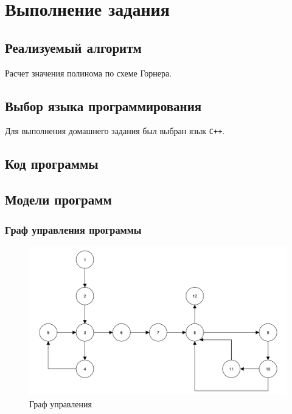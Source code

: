 \chapter{Выполнение задания}

\section{Реализуемый алгоритм}
Расчет значения полинома по схеме Горнера.

\section{Выбор языка программирования}
Для выполнения домашнего задания был выбран язык \texttt{C++}.

\section{Код программы}



\section{Модели программ}

\subsection{Граф управления программы}

\begin{figure}[h]
	\centering
	\includegraphics[height=0.4\textheight]{img/граф_управления.pdf}
	\caption{Граф управления}
\end{figure}

